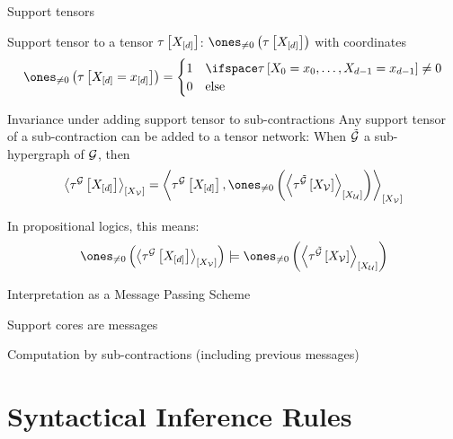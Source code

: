 \documentclass{beamer}
\begin{document}
    \begin{frame}{Support tensors}

        Support tensor to a tensor $\tau\left[X_{[d]}\right]$: $\nonzeroof{\hypercorewith}$ with coordinates
        \begin{align*}
            \nonzeroof{\hypercoreat{\indexedshortcatvariables}}
            = \begin{cases}
                  1 & \ifspace \hypercoreat{\indexedcatvariables}\neq 0 \\
                  0 & \text{else}
            \end{cases}
        \end{align*}

        \begin{block}{Invariance under adding support tensor to sub-contractions}
            Any support tensor of a sub-contraction can be added to a tensor network: When $\tilde{\mathcal{G}}$ a sub-hypergraph of $\mathcal{G}$, then
            \begin{align*}
                \contractionof{\extnetwith}{\nodevariables}
                = \contractionof{\extnetwith,
                    \nonzeroof{\contractionof{\tnetofat{\secgraph}{\nodevariables}}{\catvariableof{\secnodes}}}
                }{\nodevariables}
            \end{align*}
        \end{block}

        In propositional logics, this means:
        \begin{align*}
            \nonzeroof{\contractionof{\extnetwith}{\nodevariables}}
            \models \nonzeroof{\contractionof{\tnetofat{\secgraph}{\nodevariables}}{\catvariableof{\secnodes}}}
        \end{align*}


    \end{frame}


    \begin{frame}{Interpretation as a Message Passing Scheme}

        Support cores are messages

        Computation by sub-contractions (including previous messages)

    \end{frame}


    \section{Syntactical Inference Rules}
\end{document}
